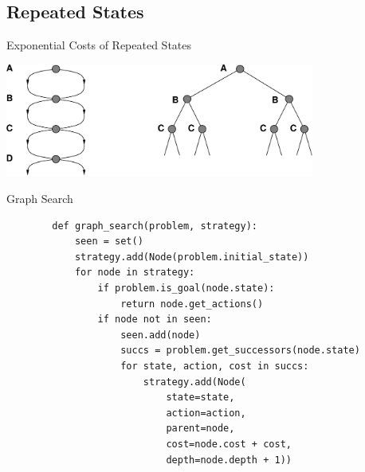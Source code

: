 \documentclass[14pt]{beamer}
\begin{document}
\subsection{Repeated States}
\begin{frame}{Exponential Costs of Repeated States}
	\begin{center}
		\includegraphics[width=4in]{ribbon-space.pdf}
	\end{center}
\end{frame}
\begin{frame}[fragile]{Graph Search}
	\scriptsize
	\begin{lstlisting}
		def graph_search(problem, strategy):
		    seen = set()
		    strategy.add(Node(problem.initial_state))
		    for node in strategy:
		        if problem.is_goal(node.state):
		            return node.get_actions()
		        if node not in seen:
		            seen.add(node)
		            succs = problem.get_successors(node.state)
		            for state, action, cost in succs:
		                strategy.add(Node(
		                    state=state,
		                    action=action,
		                    parent=node,
		                    cost=node.cost + cost,
		                    depth=node.depth + 1))
	\end{lstlisting}
\end{frame}
\end{document}
